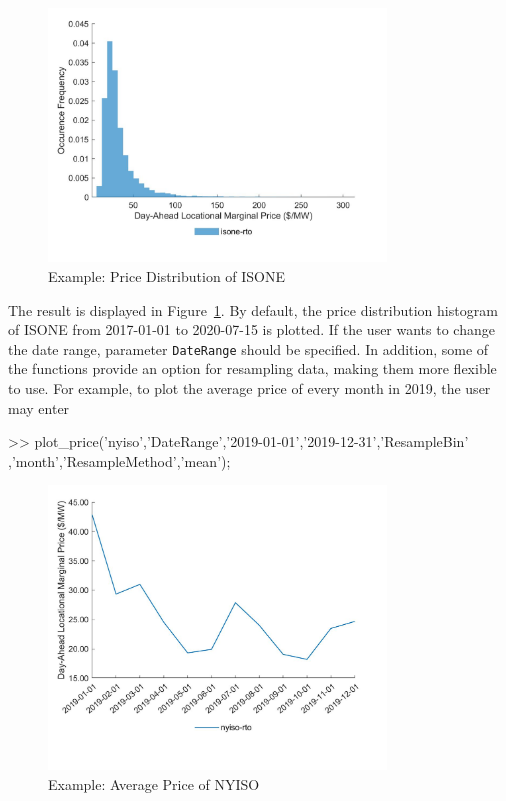 \documentclass[10pt]{article}
\numberwithin{equation}{section}
\numberwithin{table}{section}
\numberwithin{figure}{section}
\begin{document}
\begin{figure}
  \centering
  \noindent\includegraphics[width=0.8\textwidth]{figures/visualization_example1.jpg}
  \caption{Example: Price Distribution of ISONE} \label{fig:vis_eg1}
\end{figure}

The result is displayed in Figure~\ref{fig:vis_eg1}. By default, the price distribution histogram of ISONE from 2017-01-01 to 2020-07-15 is plotted. If the user wants to change the date range, parameter \verb!DateRange! should be specified. In addition, some of the functions provide an option for resampling data, making them more flexible to use. For example, to plot the average price of every month in 2019, the user may enter

\begin{Code}
 >> plot_price('nyiso','DateRange',{'2019-01-01','2019-12-31'},'ResampleBin'
    ,'month','ResampleMethod','mean');
\end{Code}

\begin{figure}
  \centering
  \noindent\includegraphics[width=0.8\textwidth]{figures/visualization_example2.jpg}
  \caption{Example: Average Price of NYISO} \label{fig:vis_eg2}
\end{figure}
\end{document}
